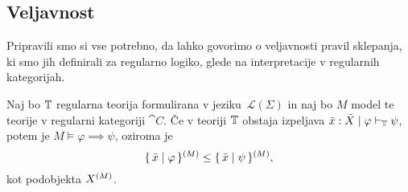\documentclass[../kategoricna_logika.tex]{subfiles}
\begin{document}
\subsection{Veljavnost}
Pripravili smo si vse potrebno, da lahko govorimo o veljavnosti pravil
sklepanja, ki smo jih definirali za regularno logiko, glede na
interpretacije v regularnih kategorijah.
\begin{izrek}[Veljavnost]
  Naj bo $\mathbb{T}$ regularna teorija formulirana v
  jeziku~$\mathcal{L}(\Sigma)$ in naj bo $M$ model te teorije v
  regularni kategoriji $\cat{C}$.  Če v teoriji $\mathbb{T}$ obstaja izpeljava
  $\bar{x}:\bar{X} \mid \varphi \vdash_{\mathbb{T}} \psi$, potem je
  $M \models \varphi \implies \psi$, oziroma je
  \[\lbrace\,\bar{x}  \mid  \varphi\,\rbrace^{(M)} \leq \lbrace\,\bar{x}
       \mid  \psi\,\rbrace^{(M)},\] kot podobjekta ${X}^{(M)}$.
\end{izrek}
\end{document}

